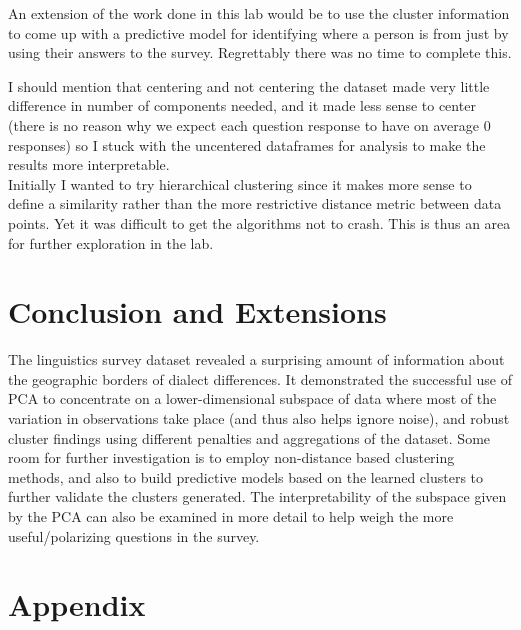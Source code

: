 \documentclass{article}\usepackage[]{graphicx}\usepackage[]{color}
\begin{document}
 An extension of the work done in this lab would be to use the cluster information to come up with a predictive model for identifying where a person is from just by using their answers to the survey.  Regrettably there was no time to complete this.  

I should mention that centering and not centering the dataset made very little difference in number of components needed, and it made less sense to center (there is no reason why we expect each question response to have on average 0 responses) so I stuck with the uncentered dataframes for analysis to make the results more interpretable.  \\

Initially I wanted to try hierarchical clustering since it makes more sense to define a similarity rather than the more restrictive distance metric between data points. Yet it was difficult to get the algorithms not to crash.  This is thus an area for further exploration in the lab.  

\section{Conclusion and Extensions}

The linguistics survey dataset revealed a surprising amount of information about the geographic borders of dialect differences.  It demonstrated the successful use of PCA to concentrate on a lower-dimensional subspace of data where most of the variation in observations take place (and thus also helps ignore noise), and robust cluster findings using different penalties and aggregations of the dataset.  Some room for further investigation is to employ non-distance based clustering methods, and also to build predictive models based on the learned clusters to further validate the clusters generated.  The interpretability of the subspace given by the PCA can also be examined in more detail to help weigh the more useful/polarizing questions in the survey.  


\section{Appendix}
\end{document}

